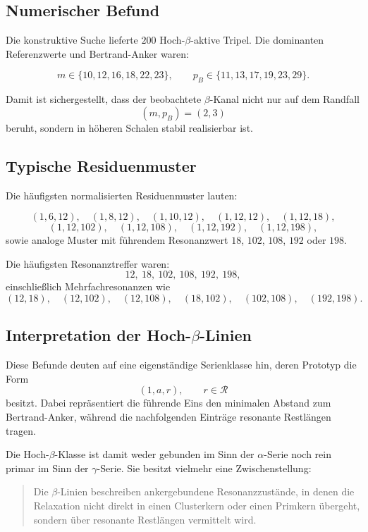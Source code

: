 \documentclass[11pt,a4paper]{article}
\theoremstyle{definition}
\theoremstyle{plain}
\theoremstyle{remark}
\begin{document}
	\subsection{Numerischer Befund}
	
	Die konstruktive Suche lieferte \(200\) Hoch-\(\beta\)-aktive Tripel. 
	Die dominanten Referenzwerte und Bertrand-Anker waren:
	
	\[
	m\in\{10,12,16,18,22,23\},
	\qquad
	p_B\in\{11,13,17,19,23,29\}.
	\]
	
	Damit ist sichergestellt, dass der beobachtete \(\beta\)-Kanal nicht nur auf dem Randfall
	\[
	(m,p_B)=(2,3)
	\]
	beruht, sondern in höheren Schalen stabil realisierbar ist.
	
	\subsection{Typische Residuenmuster}
	
	Die häufigsten normalisierten Residuenmuster lauten:
	
	\[
	(1,6,12),\quad
	(1,8,12),\quad
	(1,10,12),\quad
	(1,12,12),\quad
	(1,12,18),
	\]
	\[
	(1,12,102),\quad
	(1,12,108),\quad
	(1,12,192),\quad
	(1,12,198),
	\]
	sowie analoge Muster mit führendem Resonanzwert \(18\), \(102\), \(108\), \(192\) oder \(198\).
	
	Die häufigsten Resonanztreffer waren:
	\[
	12,\ 18,\ 102,\ 108,\ 192,\ 198,
	\]
	einschließlich Mehrfachresonanzen wie
	\[
	(12,18),\quad
	(12,102),\quad
	(12,108),\quad
	(18,102),\quad
	(102,108),\quad
	(192,198).
	\]
	
	\subsection{Interpretation der Hoch-\texorpdfstring{$\beta$}{beta}-Linien}
	
	Diese Befunde deuten auf eine eigenständige Serienklasse hin, deren Prototyp die Form
	\[
	(1,a,r),
	\qquad r\in\mathcal R
	\]
	besitzt. 
	Dabei repräsentiert die führende Eins den minimalen Abstand zum Bertrand-Anker, während die nachfolgenden Einträge resonante Restlängen tragen.
	
	Die Hoch-\(\beta\)-Klasse ist damit weder gebunden im Sinn der \(\alpha\)-Serie noch rein primar im Sinn der \(\gamma\)-Serie. 
	Sie besitzt vielmehr eine Zwischenstellung:
	
	\begin{quote}
		Die \(\beta\)-Linien beschreiben ankergebundene Resonanzzustände, in denen die Relaxation nicht direkt in einen Clusterkern oder einen Primkern übergeht, sondern über resonante Restlängen vermittelt wird.
	\end{quote}
	
\end{document}
